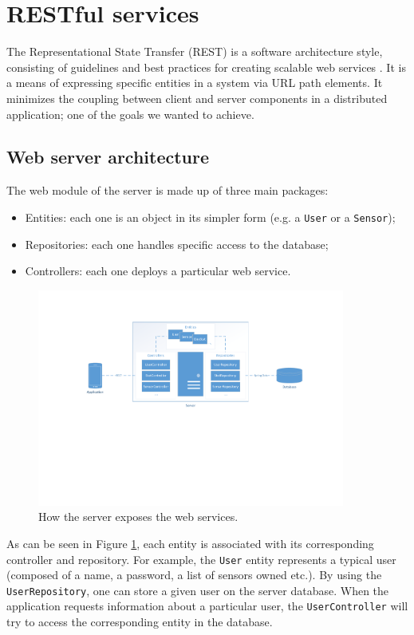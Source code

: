 \documentclass[a4paper, oneside, 11pt]{book}
\begin{document}
\section{RESTful services}
The Representational State Transfer (REST) is a software architecture style, consisting of guidelines and best practices for creating scalable web services \cite{REST:online}. It is a means of expressing specific entities in a system via URL path elements. It minimizes the coupling between client and server components in a distributed application; one of the goals we wanted to achieve.

\subsection{Web server architecture}
The web module of the server is made up of three main packages:
\begin{itemize}
	\item Entities: each one is an object in its simpler form (e.g. a \texttt{User} or a \texttt{Sensor});
	\item Repositories: each one handles specific access to the database;
	\item Controllers: each one deploys a particular web service.
\end{itemize}

\begin{figure}[htbp]
	\centerline{\includegraphics[width=0.9\textwidth]{rep_ent_contr.pdf}}
	\caption{How the server exposes the web services.}
	\label{fig:rep_ent_contr}
\end{figure}

As can be seen in Figure \ref{fig:rep_ent_contr}, each entity is associated with its corresponding controller and repository. For example, the \texttt{User} entity represents a typical user (composed of a name, a password, a list of sensors owned etc.). By using the \texttt{UserRepository}, one can store a given user on the server database. When the application requests information about a particular user, the \texttt{UserController} will try to access the corresponding entity in the database.
\end{document}

